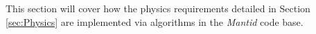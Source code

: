 This section will cover how the physics requirements detailed in Section \ref{sec:Physics} are implemented via algorithms in the \textit{Mantid} code base.